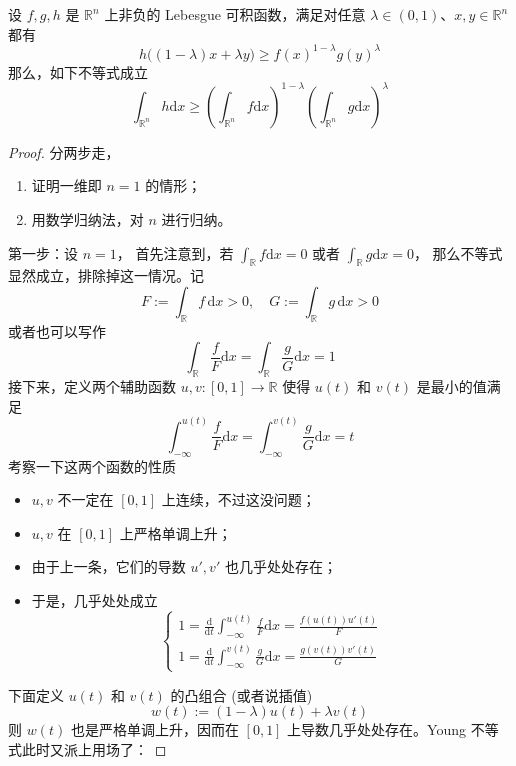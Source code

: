 \begin{theorem}\label{thm:PL}
设 $f,g,h$ 是 $\mathbb{R}^n$ 上非负的 Lebesgue 可积函数，满足对任意 $\lambda\in(0,1)$、$x,y\in\mathbb{R}^n$ 都有
\[
h\big((1-\lambda)x+\lambda y\big)\ge f(x)^{1-\lambda}g(y)^{\lambda}
\]
那么，如下不等式成立
\[
\int_{\mathbb{R}^n}h\mathrm{d}x\ge\left(\int_{\mathbb{R}^n}f\mathrm{d}x\right)^{1-\lambda}\left(\int_{\mathbb{R}^n}g\mathrm{d}x\right)^{\lambda} \label{eq:2-1}\tag{2-1}
\]
\end{theorem}
\begin{proof}
    
分两步走，

\begin{enumerate}[label=\textbf{第\chinese*步}:, leftmargin=6em]
\item 证明一维即 $n=1$ 的情形；
\item 用数学归纳法，对 $n$ 进行归纳。
\end{enumerate}

第一步：设 $n=1$， 首先注意到，若 $\displaystyle\int_{\mathbb{R}}f\mathrm{d}x=0$ 或者 $\displaystyle\int_{\mathbb{R}}g\mathrm{d}x=0$， 那么不等式显然成立，排除掉这一情况。记
\[
F:=\int_{\mathbb{R}}f\,\mathrm{d}x>0,\quad G:=\int_{\mathbb{R}}g\,\mathrm{d}x>0
\]
或者也可以写作
\[
\int_{\mathbb{R}}\frac{f}{F}\mathrm{d}x=\int_{\mathbb{R}}\frac{g}{G}\mathrm{d}x=1 \label{eq:2-2}\tag{2-2}
\]
接下来，定义两个辅助函数 $u,v:[0,1]\to\mathbb{R}$ 使得 $u(t)$ 和 $v(t)$ 是最小的值满足
\[
\int_{-\infty}^{u(t)}\frac{f}{F}\mathrm{d}x=\int_{-\infty}^{v(t)}\frac{g}{G}\mathrm{d}x=t
\]
考察一下这两个函数的性质

\begin{itemize}
\item $u,v$ 不一定在 $[0,1]$ 上连续，不过这没问题；
\item $u,v$ 在 $[0,1]$ 上严格单调上升；
\item 由于上一条，它们的导数 $u',v'$ 也几乎处处存在；
\item 于是，几乎处处成立
\[
\begin{cases}
1=\displaystyle \frac{\mathrm{d}}{\mathrm{d}t}\int_{-\infty}^{u(t)}\frac{f}{F}\mathrm{d}x=\frac{f(u(t))u'(t)}{F}\\
1=\displaystyle \frac{\mathrm{d}}{\mathrm{d}t}\int_{-\infty}^{v(t)}\frac{g}{G}\mathrm{d}x=\frac{g(v(t))v'(t)}{G}
\end{cases}
\]
\end{itemize}

下面定义 $u(t)$ 和 $v(t)$ 的凸组合 (或者说插值) 
\[
w(t):=(1-\lambda)u(t)+\lambda v(t)
\]
则 $w(t)$ 也是严格单调上升，因而在 $[0,1]$ 上导数几乎处处存在。Young 不等式此时又派上用场了：
 

\end{proof}
